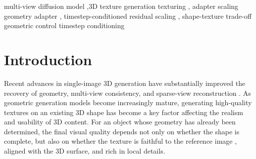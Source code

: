 \documentclass[times,twocolumn,final]{elsarticle}
\providecommand{\DIFadd}[1]{{\protect\color{blue} \sf #1}} %
\providecommand{\DIFdel}[1]{{\protect\color{red} \scriptsize #1}} %
\providecommand{\DIFaddbegin}{} %
\providecommand{\DIFaddend}{} %
\providecommand{\DIFdelbegin}{} %
\providecommand{\DIFdelend}{} %
\begin{document}
\begin{frontmatter}
\begin{abstract}
{}\DIFdelend \DIFaddbegin \DIFadd{profile gains $0.522$ dB foreground PSNR over Fixed Low while increasing the applied budget; Fixed High and Generic Linear have better means on all four image endpoints. At matched applied-scale sums, the specified Middle-high minus average(Early-high,Late-high) contrast does not detect a middle-window advantage ($-0.0339$ dB, 95\% interval $[-0.1172,+0.0514]$, $p=0.4324$). Actual native-UV baking yields a small Late-high foreground LPIPS benefit on ten compatible GeoTex objects ($-0.00265$), which is not detected in a separate twenty-object GSO study. Native MV-Adapter comparisons likewise do not detect the specified middle-window gain. The findings change the interpretation of C3 and identify practical evaluation requirements: competitive controls, matching at the implemented interface, and unseen-view assessment of the resulting asset. They establish task-specific allocation effects and limits, without a universal schedule or faithful material reproduction.
}

\DIFaddend \end{abstract}

\begin{keyword}
\KWD
multi-view diffusion \DIFdelbegin \DIFdel{model }\DIFdelend \sep 3D \DIFdelbegin \DIFdel{texture generation }\DIFdelend \DIFaddbegin \DIFadd{texturing }\DIFaddend \sep \DIFdelbegin \DIFdel{adapter scaling }\DIFdelend \DIFaddbegin \DIFadd{geometry adapter }\DIFaddend \sep \DIFdelbegin \DIFdel{timestep-conditioned }\DIFdelend \DIFaddbegin \DIFadd{residual }\DIFaddend scaling \sep \DIFdelbegin \DIFdel{shape-texture trade-off }%
\DIFdel{geometric control
}\DIFdelend \DIFaddbegin \DIFadd{timestep conditioning
}\DIFaddend \end{keyword}

\end{frontmatter}

\DIFaddbegin \raggedbottom
\DIFaddend \linenumbers

\section{Introduction}
\label{sec:intro}

\DIFdelbegin \DIFdel{Recent advances in single-image 3D generation have substantially improved the recovery of geometry, multi-view consistency, and sparse-view reconstruction \cite{liu2023zero1to3,shi2023zero123pp,liu2023syncdreamer,long2023wonder3d,shi2024mvdream,wang2023imagedream,xu2024instantmesh,ke2024era3d}. As geometric generation models become increasingly mature, generating high-quality textures on an existing 3D shape has become a key factor affecting the realism and usability of 3D content. For an object whose geometry has already been determined, the final visual quality depends not only on whether the shape is complete, but also on whether the texture is faithful to the reference image , aligned with the 3D surface, and rich in local details.
}%
\end{document}
